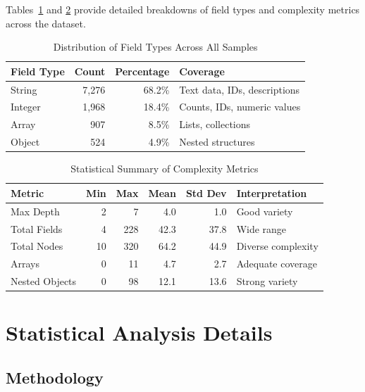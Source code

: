 \documentclass{article}
\begin{document}
Tables~\ref{tab:field-types-appendix} and \ref{tab:complexity-summary-appendix} provide detailed breakdowns of field types and complexity metrics across the dataset.

\begin{table}[H]
\centering
\caption{Distribution of Field Types Across All Samples}
\label{tab:field-types-appendix}
\begin{tabular}{lrrp{5.5cm}}
\toprule
\textbf{Field Type} & \textbf{Count} & \textbf{Percentage} & \textbf{Coverage} \\
\midrule
String & 7,276 & 68.2\% & Text data, IDs, descriptions \\
Integer & 1,968 & 18.4\% & Counts, IDs, numeric values \\
Array & 907 & 8.5\% & Lists, collections \\
Object & 524 & 4.9\% & Nested structures \\
\bottomrule
\end{tabular}
\end{table}

\begin{table}[H]
\centering
\caption{Statistical Summary of Complexity Metrics}
\label{tab:complexity-summary-appendix}
\begin{tabular}{lrrrrl}
\toprule
\textbf{Metric} & \textbf{Min} & \textbf{Max} & \textbf{Mean} & \textbf{Std Dev} & \textbf{Interpretation} \\
\midrule
Max Depth & 2 & 7 & 4.0 & 1.0 & Good variety \\
Total Fields & 4 & 228 & 42.3 & 37.8 & Wide range \\
Total Nodes & 10 & 320 & 64.2 & 44.9 & Diverse complexity \\
Arrays & 0 & 11 & 4.7 & 2.7 & Adequate coverage \\
Nested Objects & 0 & 98 & 12.1 & 13.6 & Strong variety \\
\bottomrule
\end{tabular}
\end{table}

\section{Statistical Analysis Details}
\label{sec:statistical-analysis}

\subsection{Methodology}
\end{document}
